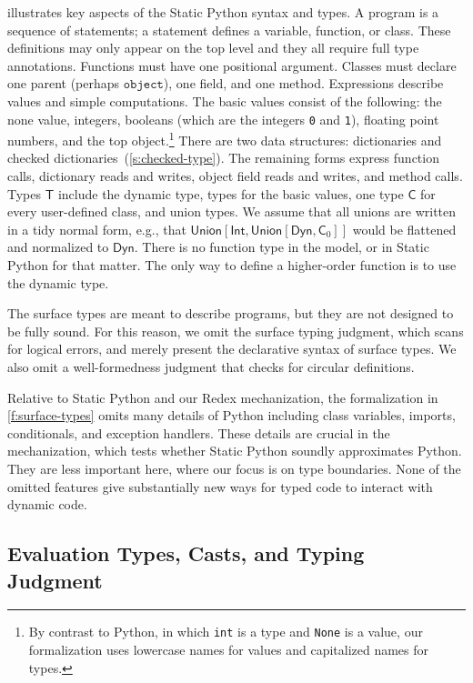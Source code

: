 \documentclass[english,cleveref,submission]{programming}
\newcommand{\SP}{Static Python}
\newcommand{\code}[1]{\texttt{#1}}
\newcommand{\typefont}[1]{\mathsf{#1}}
\newcommand{\paramtype}[2]{#1[#2]}
\newcommand{\sptype}{\typefont{T}}
\newcommand{\sptclass}{\typefont{C}}
\newcommand{\sptint}{\typefont{Int}}
\newcommand{\sptdyn}{\typefont{Dyn}}
\newcommand{\sptunion}[1]{\paramtype{\typefont{Union}}{#1}}
\newcommand{\spobject}{\code{object}}
\begin{document}
 illustrates key aspects of the \SP{} syntax and types.
A program is a sequence of statements;
a statement defines a variable, function, or class.
These definitions may only appear on the top level
and they all require full type annotations.
Functions must have one positional argument.
Classes must declare one parent (perhaps $\spobject$), one field, and one method.
Expressions describe values and simple computations.
The basic values consist of the following: the none value, integers,
booleans (which are the integers \code{0} and \code{1}), floating point numbers, and the top object.\footnote{By contrast to
Python, in which \code{int} is a type and \code{None} is a value, our formalization uses lowercase names for
values and capitalized names for types.}
There are two data structures: dictionaries and checked dictionaries~(\cref{s:checked-type}).
The remaining forms express function calls, dictionary reads and writes, object field reads and writes,
and method calls.
Types $\sptype$ include the dynamic type, types for the basic values, one type $\sptclass$ for every
user-defined class, and union types.
We assume that all unions are written in a tidy normal form, e.g., that
$\sptunion{\sptint, \sptunion{\sptdyn, \sptclass_0}}$ would be flattened and normalized to $\sptdyn$.
There is no function type in the model, or in \SP{} for that matter.
The only way to define a higher-order function is to use the dynamic type.

The surface types are meant to describe programs, but they are not designed
to be fully sound.
For this reason, we omit the surface typing judgment, which scans for
logical errors, and merely present the declarative syntax of surface types.
We also omit a well-formedness judgment that checks for circular definitions.

Relative to \SP{} and our Redex mechanization, the formalization in \cref{f:surface-types} omits
many details of Python including class variables, imports, conditionals, and exception handlers.
These details are crucial in the mechanization, which tests whether \SP{}
soundly approximates Python.
They are less important here, where our focus is on type boundaries.
None of the omitted features give substantially new ways for typed code to interact with dynamic code.


\subsection{Evaluation Types, Casts, and Typing Judgment}
\end{document}
